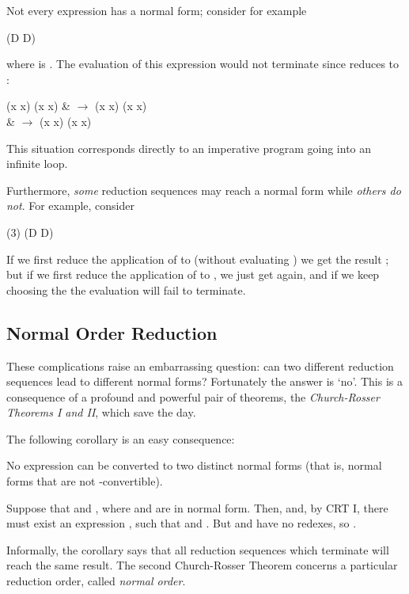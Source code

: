 Not every expression has a normal form; consider for example
\begin{mlcoded}
    (D D)
\end{mlcoded}
where  is . The evaluation of this expression would not terminate since  reduces to :
\begin{mlalign}
    (x x) (x x) & $\rightarrow$ (x x) (x x)\\
    & $\rightarrow$ (x x) (x x)
\end{mlalign}
This situation corresponds directly to an imperative program going into an infinite loop.

Furthermore, \textit{some} reduction sequences may reach a normal form while \textit{others do not}. For example, consider
\begin{mlcoded}
    (3) (D D)
\end{mlcoded}
If we first reduce the application of  to  (without evaluating ) we get the result ; but if we first reduce the application of  to , we just get  again, and if we keep choosing the  the evaluation will fail to terminate.

\subsection{Normal Order Reduction}

These complications raise an embarrassing question: can two different reduction sequences lead to different normal forms? Fortunately the answer is `no'. This is a consequence of a profound and powerful pair of theorems, the \textit{Church-Rosser Theorems I and II}, which save the day.


\noindent The following corollary is an easy consequence:
\begin{pcorollary}
No expression can be converted to two distinct normal forms (that is, normal forms that are not \ta{}-convertible).
\end{pcorollary}
\begin{pproof}
Suppose that  and , where  and  are in normal form. Then,  and, by CRT I, there must exist an expression , such that  and . But  and  have no redexes, so .
\end{pproof}
\noindent Informally, the corollary says that all reduction sequences which terminate will reach the same result. The second Church-Rosser Theorem concerns a particular reduction order, called \textit{normal order}.

